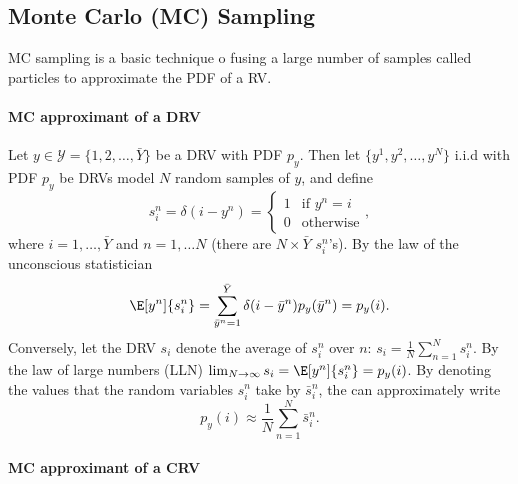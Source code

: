 \documentclass[]{hsrzf}
\theoremstyle{plain}
\theoremstyle{definition}
\theoremstyle{remark}
\begin{document}
\subsection{Monte Carlo (MC) Sampling}

MC sampling is a basic technique o fusing a large number of samples called
particles to approximate the PDF of a RV.

\paragraph{MC approximant of a DRV}

Let $y \in \mathcal{Y} = \{1,2,\ldots,\bar{Y}\}$ be a DRV with PDF $p_y$.
Then let $\{y^1, y^2, \ldots, y^N\}$ i.i.d with PDF $p_y$ be DRVs model
$N$ random samples of $y$, and define
\[
  s_i^n = \delta(i - y^n) = \begin{cases} 1 & \text{if } y^n = i \\
    0 & \text{otherwise} \end{cases},
\]
where $i = 1,\ldots,\bar{Y}$ and $n = 1, \ldots N$ (there are $N\times
\bar{Y}$ $s_i^n$'s). By the law of the unconscious statistician
\[
  \E[y^n]{s^n_i} =
    \sum_{\bar{y}^n = 1}^{\bar{Y}} \delta(i - \bar{y}^n) p_y(\bar{y}^n)
    = p_y(i).
\]
Conversely, let the DRV $s_i$ denote the average of $s_i^n$ over $n$: $s_i =
\frac{1}{N} \sum_{n=1}^N s_i^n$. By the law of large numbers
(LLN) $\lim_{N\to\infty} s_i = \E[y^n]{s_i^n} = p_y(i)$. By denoting the values that
the random variables $s_i^n$ take by $\bar{s}_i^n$, the can approximately
write
\[
  p_y(i) \approx \frac{1}{N} \sum_{n=1}^N \bar{s}_i^n.
\]

\paragraph{MC approximant of a CRV}
\end{document}
